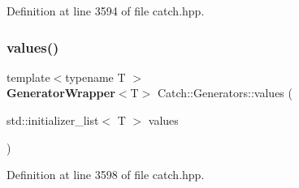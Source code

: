 Definition at line 3594 of file catch.\+hpp.

\mbox{\label{namespace_catch_1_1_generators_a55ca9a1132e662d9603c516161dcae35}} 
\subsubsection{values()}
{\footnotesize\ttfamily template$<$typename T $>$ \\
\textbf{ Generator\+Wrapper}$<$T$>$ Catch\+::\+Generators\+::values (\begin{DoxyParamCaption}\item[{std\+::initializer\+\_\+list$<$ T $>$}]{values }\end{DoxyParamCaption})}



Definition at line 3598 of file catch.\+hpp.

